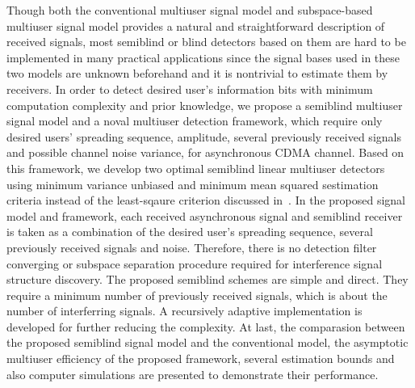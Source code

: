 \documentclass[a4paper,10pt,fleqn, twocolumn]{IEEETran}
\begin{document}
Though both the conventional multiuser signal model and
subspace-based multiuser signal model provides a natural and
straightforward description of received signals, most semiblind or
blind detectors based on them are hard to be implemented in many
practical applications since the signal bases used in these two
models are unknown beforehand and it is nontrivial to estimate
them by receivers. In order to detect desired user's information
bits with minimum computation complexity and prior knowledge, we
propose a semiblind multiuser signal model and a noval multiuser
detection framework, which require only desired users' spreading
sequence, amplitude, several previously received signals and
possible channel noise variance, for asynchronous CDMA channel.
Based on this framework, we develop two optimal semiblind linear
multiuser detectors using minimum variance unbiased and minimum
mean squared sestimation criteria instead of the least-sqaure
criterion discussed in~\cite{Wang03d,Wang03e}. In the proposed
signal model and framework, each received asynchronous signal and
semiblind receiver is taken as a combination of the desired user's
spreading sequence, several previously received signals and noise.
Therefore, there is no detection filter converging or subspace
separation procedure required for interference signal structure
discovery. The proposed semiblind schemes are simple and direct.
They require a minimum number of previously received signals,
which is about the number of interferring signals. A recursively
adaptive implementation is developed for further reducing the
complexity. At last, the comparasion between the proposed
semiblind signal model and the conventional model, the asymptotic
multiuser efficiency of the proposed framework, several estimation
bounds and also computer simulations are presented to demonstrate
their performance.
\end{document}
